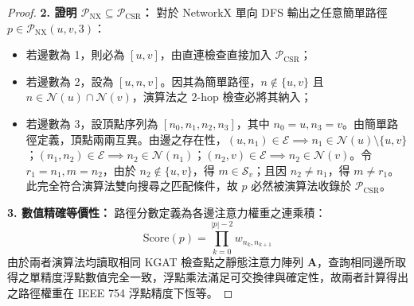 \begin{proof}
\textbf{2. 證明 $\mathcal{P}_{\text{NX}} \subseteq \mathcal{P}_{\text{CSR}}$：}
對於 NetworkX 單向 DFS 輸出之任意簡單路徑 $p \in \mathcal{P}_{\text{NX}}(u, v, 3)$：
\begin{itemize}[leftmargin=2em]
  \item 若邊數為 1，則必為 $[u, v]$，由直連檢查直接加入 $\mathcal{P}_{\text{CSR}}$；
  \item 若邊數為 2，設為 $[u, n, v]$。因其為簡單路徑，$n \notin \{u, v\}$ 且 $n \in \mathcal{N}(u) \cap \mathcal{N}(v)$，演算法之 2-hop 檢查必將其納入；
  \item 若邊數為 3，設頂點序列為 $[n_0, n_1, n_2, n_3]$，其中 $n_0 = u, n_3 = v$。由簡單路徑定義，頂點兩兩互異。由邊之存在性，$(u, n_1) \in \mathcal{E} \implies n_1 \in \mathcal{N}(u) \setminus \{u, v\}$；$(n_1, n_2) \in \mathcal{E} \implies n_2 \in \mathcal{N}(n_1)$；$(n_2, v) \in \mathcal{E} \implies n_2 \in \mathcal{N}(v)$。令 $r_1 = n_1, m = n_2$，由於 $n_2 \notin \{u, v\}$，得 $m \in \mathcal{S}_v$；且因 $n_2 \ne n_1$，得 $m \ne r_1$。此完全符合演算法雙向搜尋之匹配條件，故 $p$ 必然被演算法收錄於 $\mathcal{P}_{\text{CSR}}$。
\end{itemize}

\textbf{3. 數值精確等價性：}
路徑分數定義為各邊注意力權重之連乘積：
\begin{equation}
  \text{Score}(p) = \prod_{k=0}^{|p|-2} w_{n_k, n_{k+1}}
\end{equation}
由於兩者演算法均讀取相同 KGAT 檢查點之靜態注意力陣列 $\mathbf{A}$，查詢相同邊所取得之單精度浮點數值完全一致，浮點乘法滿足可交換律與確定性，故兩者計算得出之路徑權重在 IEEE 754 浮點精度下恆等。
\end{proof}
